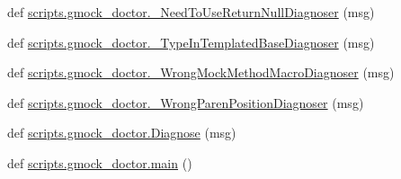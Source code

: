 \begin{DoxyCompactItemize}
\item 
def \mbox{\hyperlink{namespacescripts_1_1gmock__doctor_aa8ff5292547ab4ff5a3e4553858309c7}{scripts.\+gmock\+\_\+doctor.\+\_\+\+Need\+To\+Use\+Return\+Null\+Diagnoser}} (msg)
\item 
def \mbox{\hyperlink{namespacescripts_1_1gmock__doctor_a9241b019bd0c455582ed243bd2c0a196}{scripts.\+gmock\+\_\+doctor.\+\_\+\+Type\+In\+Templated\+Base\+Diagnoser}} (msg)
\item 
def \mbox{\hyperlink{namespacescripts_1_1gmock__doctor_a2c0900fea0e3c4a3556b19bd9ed7126c}{scripts.\+gmock\+\_\+doctor.\+\_\+\+Wrong\+Mock\+Method\+Macro\+Diagnoser}} (msg)
\item 
def \mbox{\hyperlink{namespacescripts_1_1gmock__doctor_aff422d37d1505c339b2cc861f37aa869}{scripts.\+gmock\+\_\+doctor.\+\_\+\+Wrong\+Paren\+Position\+Diagnoser}} (msg)
\item 
def \mbox{\hyperlink{namespacescripts_1_1gmock__doctor_a7a23f6a3a8dc361e0b24afe89daf4b80}{scripts.\+gmock\+\_\+doctor.\+Diagnose}} (msg)
\item 
def \mbox{\hyperlink{namespacescripts_1_1gmock__doctor_a1bededdb0621eefd9ac1d1d668142400}{scripts.\+gmock\+\_\+doctor.\+main}} ()
\end{DoxyCompactItemize}
